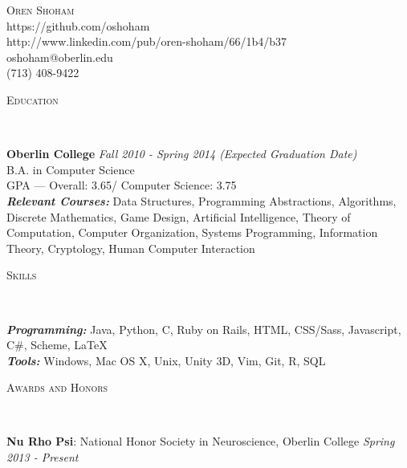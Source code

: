 \documentclass[9pt]{article}
\newenvironment{changemargin}[2]{%
  \begin{list}{}{%
    \setlength{\topsep}{0pt}%
    \setlength{\leftmargin}{#1}%
    \setlength{\rightmargin}{#2}%
    \setlength{\listparindent}{\parindent}%
    \setlength{\itemindent}{\parindent}%
    \setlength{\parsep}{\parskip}%
  }%
  \item[]}{\end{list}
}
\newcommand{\lineover}{
	\begin{changemargin}{-0.05in}{-0.05in}
		\vspace*{-8pt}
		\hrulefill \\
		\vspace*{-2pt}
	\end{changemargin}
}
\newcommand{\header}[1]{
	\begin{changemargin}{-0.5in}{-0.5in}
		\scshape{#1}\\
  	\lineover
	\end{changemargin}
}
\newcommand{\contact}[5]{
	\begin{changemargin}{-0.5in}{-0.5in}
		\begin{center}
			{\Large \scshape {#1}}\\ \smallskip
			{#2}\\ \smallskip 
			{#3}\\ \smallskip
			{#4}\\ \smallskip
			{#5}\smallskip
		\end{center}
	\end{changemargin}
}
\newenvironment{body} {
	\vspace*{-16pt}
	\begin{changemargin}{-0.25in}{-0.5in}
  }	
	{\end{changemargin}
}
\begin{document}
\contact{Oren Shoham}{https://github.com/oshoham}{http://www.linkedin.com/pub/oren-shoham/66/1b4/b37}{oshoham@oberlin.edu}{(713) 408-9422}


\header{Education}

\begin{body}
	\vspace{14pt}
	\textbf{Oberlin College}{} \hfill \emph{Fall 2010 - Spring 2014 (Expected Graduation Date)}{} \\
	B.A. in Computer Science \\
	GPA --- Overall: 3.65/ Computer Science: 3.75 \\
	\medskip
	\emph{{\bf Relevant Courses:}} Data Structures, Programming Abstractions, Algorithms, Discrete Mathematics, Game Design, Artificial Intelligence, Theory of Computation, Computer Organization, Systems Programming, Information Theory, Cryptology, Human Computer Interaction
\end{body}

\smallskip

\header{Skills}

\begin{body}
	\vspace{14pt}
	\emph{\textbf{Programming:}}{} Java, Python, C, Ruby on Rails, HTML, CSS/Sass, Javascript, C\#, Scheme, \LaTeX \\
	\medskip
	\emph{\textbf{Tools:}}{} Windows, Mac OS X, Unix, Unity 3D, Vim, Git, R, SQL \\
\end{body}

\smallskip

\header{Awards and Honors}

\begin{body}
	\vspace{14pt}
	\textbf{Nu Rho Psi}: National Honor Society in Neuroscience, Oberlin College \hfill{} \emph{Spring 2013 - Present}\\
	\smallskip
\end{body}

\smallskip
\end{document}
